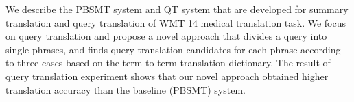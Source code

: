 We describe the PBSMT system and QT system that are developed for summary translation and query translation of WMT 14 medical translation task. We focus on query translation and propose a novel approach that divides a query into single phrases, and finds query translation candidates for each phrase according to three cases based on the term-to-term translation dictionary. The result of query translation experiment shows that our novel approach obtained higher translation accuracy than the baseline (PBSMT) system.

